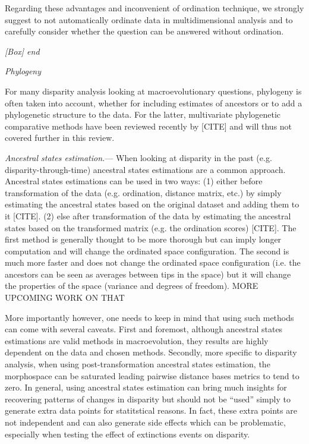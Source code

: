 \documentclass[12pt,letterpaper]{article}
\renewcommand{\subsection}[1]{%
\bigskip
\begin{center}
\begin{large}
\normalfont\itshape #1
\end{large}
\end{center}}
\renewcommand{\subsubsection}[1]{%
\vspace{2ex}
\noindent
\textit{#1.}---}
\begin{document}
Regarding these advantages and inconvenient of ordination technique, we strongly suggest to not automatically ordinate data in multidimensional analysis and to carefully consider whether the question can be answered without ordination.
\subsection{[Box] end}

\subsection{Phylogeny}
For many disparity analysis looking at macroevolutionary questions, phylogeny is often taken into account, whether for including estimates of ancestors or to add a phylogenetic structure to the data.
For the latter, multivariate phylogenetic comparative methods have been reviewed recently by [CITE] %
and will thus not covered further in this review.

\subsubsection{Ancestral states estimation}
When looking at disparity in the past (e.g. disparity-through-time) ancestral states estimations are a common approach.
Ancestral states estimations can be used in two ways:
(1) either before transformation of the data (e.g. ordination, distance matrix, etc.) by simply estimating the ancestral states based on the original dataset and adding them to it [CITE].
(2) else after transformation of the data by estimating the ancestral states based on the transformed matrix (e.g. the ordination scores) [CITE].
The first method is generally thought to be more thorough but can imply longer computation and will change the ordinated space configuration.
The second is much more faster and does not change the ordinated space configuration (i.e. the ancestors can be seen as averages between tips in the space) but it will change the properties of the space (variance and degrees of freedom).
MORE UPCOMING WORK ON THAT

More importantly however, one needs to keep in mind that using such methods can come with several caveats.
First and foremost, although ancestral states estimations are valid methods in macroevolution, they results are highly dependent on the data and chosen methods.
Secondly, more specific to disparity analysis, when using post-transformation ancestral states estimation, the morphospace can be saturated leading pairwise distance bases metrics to tend to zero.
In general, using ancestral states estimation can bring much insights for recovering patterns of changes in disparity but should not be ``used'' simply to generate extra data points for statitstical reasons.
In fact, these extra points are not independent and can also generate side effects which can be problematic, especially when testing the effect of extinctions events on disparity.
\end{document}
